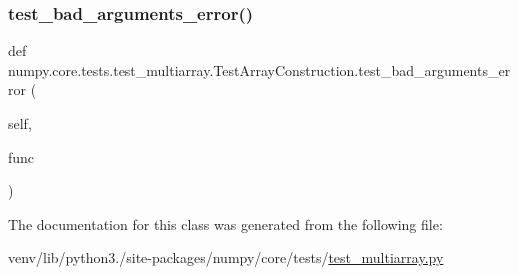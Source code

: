 \subsubsection{\texorpdfstring{test\+\_\+bad\+\_\+arguments\+\_\+error()}{test\_bad\_arguments\_error()}}
{\footnotesize\ttfamily def numpy.\+core.\+tests.\+test\+\_\+multiarray.\+Test\+Array\+Construction.\+test\+\_\+bad\+\_\+arguments\+\_\+error (\begin{DoxyParamCaption}\item[{}]{self,  }\item[{}]{func }\end{DoxyParamCaption})}



The documentation for this class was generated from the following file\+:\begin{DoxyCompactItemize}
\item 
venv/lib/python3./site-\/packages/numpy/core/tests/\hyperlink{core_2tests_2test__multiarray_8py}{test\+\_\+multiarray.\+py}\end{DoxyCompactItemize}
